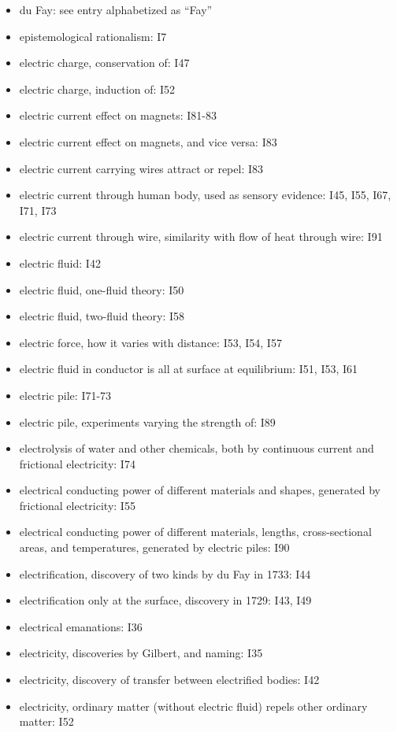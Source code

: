 \documentclass[a4paper]{article}
\theoremstyle{plain}
\theoremstyle{definition}
\begin{document}
\begin{itemize}
\item du Fay: see entry alphabetized as ``Fay''
\item epistemological rationalism: I7
\item electric charge, conservation of: I47
\item electric charge, induction of: I52
\item electric current effect on magnets: I81-83
\item electric current effect on magnets, and vice versa: I83
\item electric current carrying wires attract or repel: I83
\item electric current through human body, used as sensory evidence: I45, I55, I67, I71, I73
\item electric current through wire, similarity with flow of heat through wire: I91
\item electric fluid: I42
\item electric fluid, one-fluid theory: I50
\item electric fluid, two-fluid theory: I58
\item electric force, how it varies with distance: I53, I54, I57
\item electric fluid in conductor is all at surface at equilibrium: I51, I53, I61
\item electric pile: I71-73
\item electric pile, experiments varying the strength of: I89
\item electrolysis of water and other chemicals, both by continuous current and frictional electricity: I74
\item electrical conducting power of different materials and shapes, generated by frictional electricity: I55
\item electrical conducting power of different materials, lengths, cross-sectional areas, and temperatures, generated by electric piles: I90
\item electrification, discovery of two kinds by du Fay in 1733: I44
\item electrification only at the surface, discovery in 1729: I43, I49
\item electrical emanations: I36
\item electricity, discoveries by Gilbert, and naming: I35
\item electricity, discovery of transfer between electrified bodies: I42
\item electricity, ordinary matter (without electric fluid) repels other ordinary matter: I52

\end{itemize}
\end{document}
